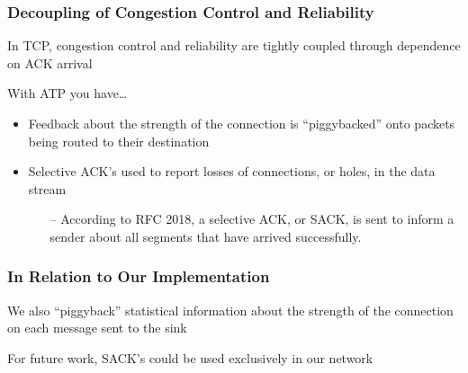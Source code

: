 \begin{frame}[t]
  \frametitle{Decoupling of Congestion Control and Reliability}

  In TCP, congestion control and reliability are tightly coupled through dependence on ACK arrival

  \vfill
  
  With ATP you have\dots

  \begin{itemize}
  \item Feedback about the strength of the connection is “piggybacked” onto packets being routed to their destination
  \item Selective ACK’s used to report losses of connections, or holes, in the data stream
    \begin{itemize}
    \item[--] According to RFC 2018, a selective ACK, or SACK, is sent to inform a sender about all segments that have arrived successfully.
    \end{itemize}
  \end{itemize}

  \vfill

  \begin{flushleft}
    \begin{tiny}
      \begin{minipage}{1.0\linewidth}
      \end{minipage}
    \end{tiny}
  \end{flushleft}
  
\end{frame}
    
\begin{frame}[t]
  \frametitle{In Relation to Our Implementation}

  \vfill
  
  We also “piggyback” statistical information about the strength of the connection on each message sent to the sink
  \vfill
  
  For future work, SACK’s could be used exclusively in our network

  \vspace{\vfill}
  
  \begin{flushleft}
    \begin{tiny}
      \begin{minipage}{1.0\linewidth}
      \end{minipage}
    \end{tiny}
  \end{flushleft}

\end{frame}
